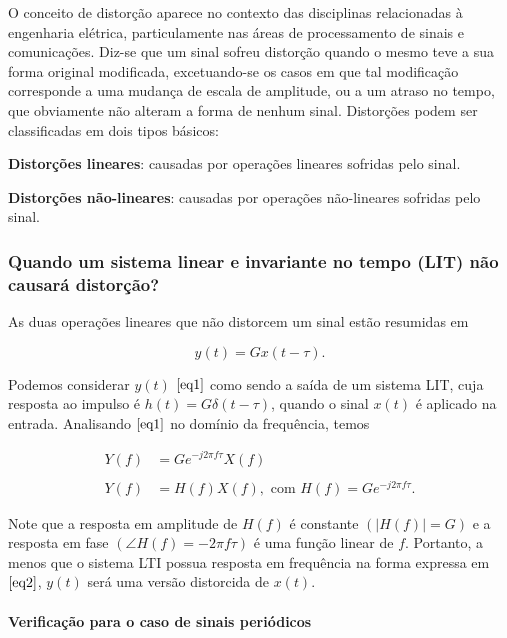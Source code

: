 \documentclass[11pt]{article}
\begin{document}
O conceito de distorção aparece no contexto das disciplinas relacionadas
à engenharia elétrica, particulamente nas áreas de processamento de
sinais e comunicações. Diz-se que um sinal sofreu distorção quando o
mesmo teve a sua forma original modificada, excetuando-se os casos em
que tal modificação corresponde a uma mudança de escala de amplitude, ou
a um atraso no tempo, que obviamente não alteram a forma de nenhum
sinal. Distorções podem ser classificadas em dois tipos básicos:

\textbf{Distorções lineares}: causadas por operações lineares sofridas
pelo sinal.

\textbf{Distorções não-lineares}: causadas por operações não-lineares
sofridas pelo sinal.

\hypertarget{quando-um-sistema-linear-e-invariante-no-tempo-lit-nuxe3o-causaruxe1-distoruxe7uxe3o}{%
\subsubsection{Quando um sistema linear e invariante no tempo (LIT) não
causará
distorção?}\label{quando-um-sistema-linear-e-invariante-no-tempo-lit-nuxe3o-causaruxe1-distoruxe7uxe3o}}

As duas operações lineares que não distorcem um sinal estão resumidas em

 
\begin{equation}
y(t)=Gx(t-\tau).
\label{eq1} \tag{1}
\end{equation}


Podemos considerar \(y(t)\) \(\eqref{eq1}\) como sendo a saída de um
sistema LIT, cuja resposta ao impulso é \(h(t)=G\delta(t-\tau)\), quando
o sinal \(x(t)\) é aplicado na entrada. Analisando \(\eqref{eq1}\) no
domínio da frequência, temos

 
\begin{align}
Y(f)&=Ge^{-j2\pi f \tau}X(f)\\ \\
Y(f)&=H(f)X(f), \text { com } H(f) = Ge^{-j2\pi f \tau}.
\label{eq2} \tag{2}
\end{align}


Note que a resposta em amplitude de \(H(f)\) é constante
\(\left(|H(f)|=G\right)\) e a resposta em fase
\(\left(\angle H(f)=-2\pi f \tau\right)\) é uma função linear de \(f\).
Portanto, a menos que o sistema LTI possua resposta em frequência na
forma expressa em \(\eqref{eq2}\), \(y(t)\) será uma versão distorcida
de \(x(t)\).

\hypertarget{verificauxe7uxe3o-para-o-caso-de-sinais-periuxf3dicos}{%
\paragraph{Verificação para o caso de sinais
periódicos}\label{verificauxe7uxe3o-para-o-caso-de-sinais-periuxf3dicos}}
\end{document}
